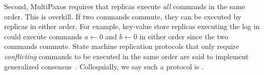 Second, MultiPaxos requires that replicas execute \emph{all} commands in the
same order. This is overkill. If two commands commute, they can be executed by
replicas in either order. For example, key-value store replicas executing the
log in  could execute commands $a \gets 0$
and $b \gets 0$ in either order since the two commands commute. State machine
replication protocols that only require \emph{conflicting} commands to be
executed in the same order are said to implement generalized
consensus~\cite{lamport2005generalized}. Colloquially, we say such a protocol
is .

